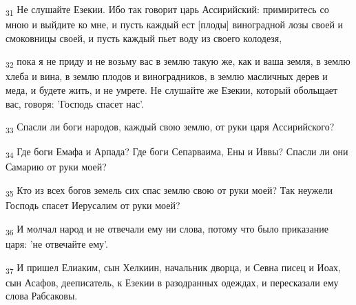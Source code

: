 \begin{tcolorbox}
\textsubscript{31} Не слушайте Езекии. Ибо так говорит царь Ассирийский: примиритесь со мною и выйдите ко мне, и пусть каждый ест [плоды] виноградной лозы своей и смоковницы своей, и пусть каждый пьет воду из своего колодезя,
\end{tcolorbox}
\begin{tcolorbox}
\textsubscript{32} пока я не приду и не возьму вас в землю такую же, как и ваша земля, в землю хлеба и вина, в землю плодов и виноградников, в землю масличных дерев и меда, и будете жить, и не умрете. Не слушайте же Езекии, который обольщает вас, говоря: 'Господь спасет нас'.
\end{tcolorbox}
\begin{tcolorbox}
\textsubscript{33} Спасли ли боги народов, каждый свою землю, от руки царя Ассирийского?
\end{tcolorbox}
\begin{tcolorbox}
\textsubscript{34} Где боги Емафа и Арпада? Где боги Сепарваима, Ены и Иввы? Спасли ли они Самарию от руки моей?
\end{tcolorbox}
\begin{tcolorbox}
\textsubscript{35} Кто из всех богов земель сих спас землю свою от руки моей? Так неужели Господь спасет Иерусалим от руки моей?
\end{tcolorbox}
\begin{tcolorbox}
\textsubscript{36} И молчал народ и не отвечали ему ни слова, потому что было приказание царя: 'не отвечайте ему'.
\end{tcolorbox}
\begin{tcolorbox}
\textsubscript{37} И пришел Елиаким, сын Хелкиин, начальник дворца, и Севна писец и Иоах, сын Асафов, дееписатель, к Езекии в разодранных одеждах, и пересказали ему слова Рабсаковы.
\end{tcolorbox}
